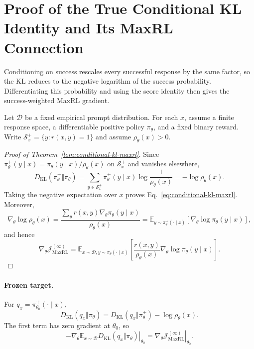 \section{Proof of the True Conditional KL Identity and Its MaxRL Connection}
\label{app:conditional-kl-maxrl}

\begin{insight}
Conditioning on success rescales every successful response by the same
factor, so the KL reduces to the negative logarithm of the success probability.
Differentiating this probability and using the score identity then gives
the success-weighted MaxRL gradient.
\end{insight}

Let $\mathcal D$ be a fixed empirical prompt distribution. For each $x$,
assume a finite response space, a differentiable positive policy
$\pi_\theta$, and a fixed binary reward. Write
$\mathcal S_x^+=\{y:r(x,y)=1\}$ and assume $\rho_\theta(x)>0$.

\begin{proof}[Proof of Theorem~\ref{lem:conditional-kl-maxrl}]
Since $\pi_\theta^+(y\mid x)=\pi_\theta(y\mid x)/\rho_\theta(x)$ on
$\mathcal S_x^+$ and vanishes elsewhere,
\begin{equation}
 D_{\mathrm{KL}}(\pi_\theta^+\Vert\pi_\theta)
 =\sum_{y\in\mathcal S_x^+}\pi_\theta^+(y\mid x)
       \log\frac1{\rho_\theta(x)}
 =-\log\rho_\theta(x).
 \label{eq:app-success-kl}
\end{equation}
Taking the negative expectation over $x$ proves
Eq.~\eqref{eq:conditional-kl-maxrl}. Moreover,
\begin{equation}
 \nabla_\theta\log\rho_\theta(x)
 =\frac{\sum_y r(x,y)\nabla_\theta\pi_\theta(y\mid x)}{\rho_\theta(x)}
 =\mathbb E_{y\sim\pi_\theta^+(\cdot\mid x)}
       [\nabla_\theta\log\pi_\theta(y\mid x)],
 \label{eq:app-success-score}
\end{equation}
and hence
\begin{equation}
 \nabla_\theta\mathcal J_{\mathrm{MaxRL}}^{(\infty)}
 =\mathbb E_{x\sim\mathcal D,y\sim\pi_\theta(\cdot\mid x)}
 \left[\frac{r(x,y)}{\rho_\theta(x)}
              \nabla_\theta\log\pi_\theta(y\mid x)\right].
 \label{eq:maxrl-gradient}
\end{equation}
\end{proof}

\paragraph{Frozen target.}
For $q_x=\pi_{\theta_0}^+(\cdot\mid x)$,
\begin{equation}
 D_{\mathrm{KL}}(q_x\Vert\pi_\theta)
 =D_{\mathrm{KL}}(q_x\Vert\pi_\theta^+)-\log\rho_\theta(x).
 \label{eq:app-success-frozen-decomposition}
\end{equation}
The first term has zero gradient at $\theta_0$, so
\begin{equation}
 \left.-\nabla_\theta\mathbb E_{x\sim\mathcal D}
 D_{\mathrm{KL}}(q_x\Vert\pi_\theta)\right|_{\theta_0}
 =\left.\nabla_\theta\mathcal J_{\mathrm{MaxRL}}^{(\infty)}
 \right|_{\theta_0}.
 \label{eq:app-success-frozen-gradient}
\end{equation}

